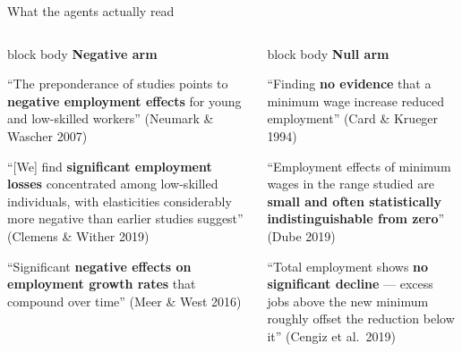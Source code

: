\documentclass[aspectratio=169,12pt,t]{beamer}
\begin{document}
\begin{frame}[shrink=13]{What the agents actually read}

\vspace{0.1cm}
\begin{columns}[T]

\begin{beamercolorbox}[rounded=true,sep=6pt,wd=\linewidth]{block body}%
  \textcolor{negarm}{\small\bfseries Negative arm}\\[4pt]
  {\fontsize{8}{10}\selectfont\color{inkblack}
   ``The preponderance of studies points to
   \textbf{negative employment effects}
   for young and low-skilled workers''
   {\color{warmgray}(Neumark \& Wascher 2007)}

   \vspace{5pt}
   ``[We] find \textbf{significant employment losses}
   concentrated among low-skilled individuals,
   with elasticities considerably more negative
   than earlier studies suggest''
   {\color{warmgray}(Clemens \& Wither 2019)}

   \vspace{5pt}
   ``Significant \textbf{negative effects on employment
   growth rates} that compound over time''
   {\color{warmgray}(Meer \& West 2016)}
  }
\end{beamercolorbox}

\begin{beamercolorbox}[rounded=true,sep=6pt,wd=\linewidth]{block body}%
  \textcolor{nullarm}{\small\bfseries Null arm}\\[4pt]
  {\fontsize{8}{10}\selectfont\color{inkblack}
   ``Finding \textbf{no evidence} that a minimum wage
   increase reduced employment''
   {\color{warmgray}(Card \& Krueger 1994)}

   \vspace{5pt}
   ``Employment effects of minimum wages in
   the range studied are \textbf{small and often
   statistically indistinguishable from zero}''
   {\color{warmgray}(Dube 2019)}

   \vspace{5pt}
   ``Total employment shows \textbf{no significant
   decline} — excess jobs above the new minimum
   roughly offset the reduction below it''
   {\color{warmgray}(Cengiz et al.\ 2019)}
  }
\end{beamercolorbox}


\end{columns}
\end{frame}
\end{document}

